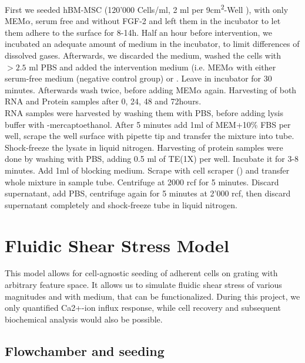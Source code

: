 First we seeded hBM-MSC (120'000 Cells/ml, 2 ml per 9cm\textsuperscript{2}-Well ), with only MEM$\alpha$, serum free and without FGF-2 and left them in the incubator  to let them adhere to the surface for 8-14h. Half an hour before intervention, we incubated an adequate amount of medium in the incubator, to limit differences of dissolved gases. Afterwards, we discarded the medium, washed the cells with $> 2.5$ ml PBS and added the intervention medium (i.e. MEM$\alpha$ with either serum-free medium (negative control group) or  \Yoda. Leave in incubator for 30 minutes. Afterwards wash twice, before adding MEM$\alpha$ again. Harvesting of both RNA and Protein samples after 0, 24, 48 and 72hours.\\ 
RNA samples were harvested by washing them with PBS, before adding lysis buffer with \textbeta-mercaptoethanol. After 5 minutes add 1ml of MEM\textalpha{ }+10\% FBS per well, scrape the well surface with pipette tip and transfer the mixture into tube. Shock-freeze the lysate in liquid nitrogen. Harvesting of protein samples were done by washing with PBS, adding 0.5 ml of TE(1X) per well. Incubate it for 3-8 minutes. Add 1ml of blocking medium. Scrape with cell scraper ()  and transfer whole mixture in sample tube. Centrifuge at 2000 rcf for 5 minutes. Discard supernatant, add PBS, centrifuge again for 5 minutes at 2'000 rcf, then discard supernatant completely and shock-freeze tube in liquid nitrogen. 


\section{Fluidic Shear Stress Model}

This model allows for cell-agnostic seeding of adherent cells on grating with arbitrary feature space. It allows us to simulate fluidic shear stress of various magnitudes and with medium, that can be functionalized. During this project, we only quantified Ca2+-ion influx response, while cell recovery and subsequent biochemical analysis would also be possible. 

\subsection{Flowchamber and seeding}

